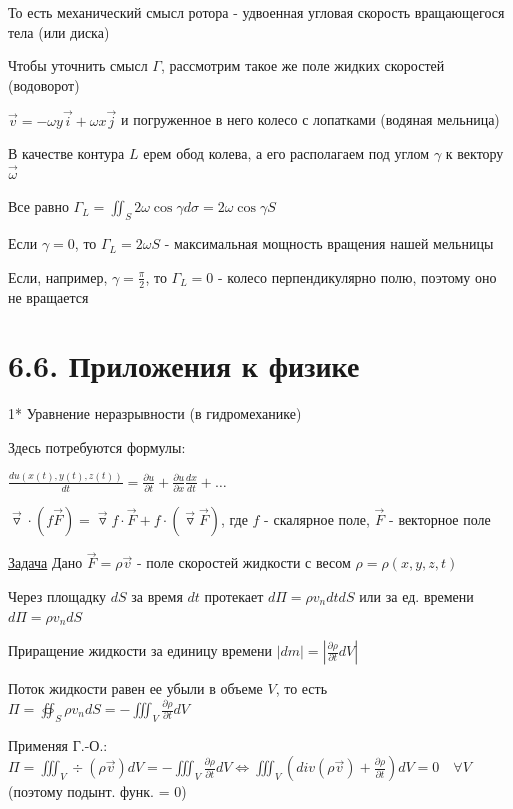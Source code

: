 \documentclass[12pt]{article}
\begin{document}
    То есть механический смысл ротора - удвоенная угловая скорость вращающегося тела (или диска)

    \Nota Чтобы уточнить смысл $\Gamma$, рассмотрим такое же поле жидких скоростей (водоворот)

    $\overrightarrow{v} = -\omega y \overrightarrow{i} + \omega x \overrightarrow{j}$ и погруженное в него колесо с лопатками (водяная мельница)

    В качестве контура $L$ ерем обод колева, а его располагаем под углом $\gamma$ к вектору $\overrightarrow{\omega}$

    Все равно $\Gamma_L = \iint_S 2\omega \cos \gamma d\sigma = 2\omega\cos \gamma S$

    Если $\gamma = 0$, то $\Gamma_L = 2\omega S$ - максимальная мощность вращения нашей мельницы

    Если, например, $\gamma = \frac{\pi}{2}$, то $\Gamma_L = 0$ - колесо перпендикулярно полю, поэтому оно не вращается

    \section{6.6. Приложения к физике}

    1* Уравнение неразрывности (в гидромеханике)

    \Nota Здесь потребуются формулы:

    $\frac{du(x(t), y(t), z(t))}{dt} = \frac{\partial u}{\partial t} + \frac{\partial u}{\partial x}\frac{dx}{dt} + \dots$

    $\overrightarrow{\triangledown} \cdot (f\overrightarrow{F}) = \overrightarrow{\triangledown} f \cdot \overrightarrow{F} + f \cdot (\overrightarrow{\triangledown} \overrightarrow{F})$, где $f$ - скалярное поле, $\overrightarrow{F}$ - векторное поле

    \underline{Задача} Дано $\overrightarrow{F} = \rho \overrightarrow{v}$ - поле скоростей жидкости с весом $\rho = \rho(x, y, z, t)$

    Через площадку $dS$ за время $dt$ протекает $d\Pi = \rho v_n dt dS$ или за ед. времени $d\Pi = \rho v_n dS$

    Приращение жидкости за единицу времени $|dm| = |\frac{\partial \rho}{\partial t} dV|$

    Поток жидкости равен ее убыли в объеме $V$, то есть $\Pi = \oiint_S \rho v_n dS = -\iiint_V \frac{\partial \rho}{\partial t} dV$

    Применяя Г.-О.: $\Pi = \iiint_V \div (\rho \overrightarrow{v}) dV = -\iiint_V \frac{\partial \rho}{\partial t} dV \Longleftrightarrow \iiint_V (div (\rho \overrightarrow{v}) + \frac{\partial \rho}{\partial t}) dV = 0 \quad \forall V$ (поэтому подынт. функ. = 0)
\end{document}
